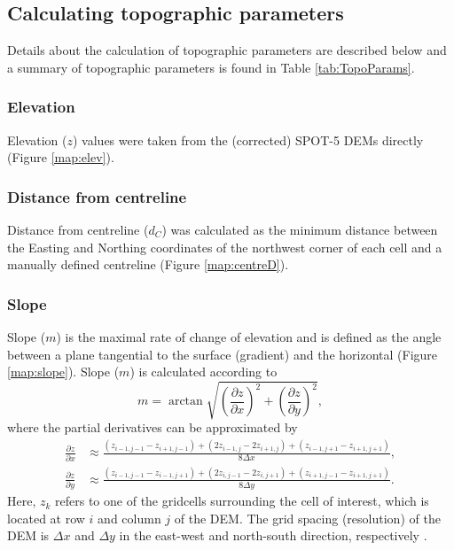 \documentclass{sfuthesis}
\begin{document}
{\subsection{Calculating topographic parameters}

Details about the calculation of topographic parameters are described below and a summary of topographic parameters is found in Table \ref{tab:TopoParams}.
\subsubsection*{Elevation}

Elevation ($z$) values were taken from the (corrected) SPOT-5 DEMs directly (Figure \ref{map:elev}).

\subsubsection*{Distance from centreline}

Distance from centreline ($d_C$) was calculated as the minimum distance between the Easting and Northing coordinates of the northwest corner of each cell and a manually defined centreline (Figure \ref{map:centreD}). 


\subsubsection*{Slope} 

Slope ($m$) is the maximal rate of change of elevation and is defined as the angle between a plane tangential to the surface (gradient) and the horizontal \citep{Olaya2009} (Figure \ref{map:slope}). Slope ($m$) is calculated according to 
\begin{equation}
m = \arctan \sqrt{\left( \frac{\partial z}{\partial x} \right) ^2 + \left( \frac{\partial z}{\partial y} \right) ^2},
\end{equation}
where the partial derivatives can be approximated by \citep{Mitavsova1993, Neteler2008, Hofierka2009}
\begin{align} \label{eq:firstpartial}
\frac{\partial z}{\partial x} &\approx \frac{(z_{i-1,j-1}-z_{i+1,j-1})+(2z_{i-1,j}-2z_{i+1,j})+(z_{i-1,j+1}-z_{i+1,j+1})}{8  \Delta x},\nonumber \\
\frac{\partial z}{\partial y} &\approx \frac{(z_{i-1,j-1}-z_{i-1,j+1})+(2z_{i,j-1}-2z_{i,j+1})+(z_{i+1,j-1}-z_{i+1,j+1})}{8  \Delta y}.
\end{align}
Here, $z_k$ refers to one of the gridcells surrounding the cell of interest, which is located at row $i$ and column $j$ of the DEM. The grid spacing (resolution) of the DEM is $\Delta x$ and $\Delta y$ in the east-west and north-south direction, respectively \citep{Neteler2008}. 

}
\end{document}
